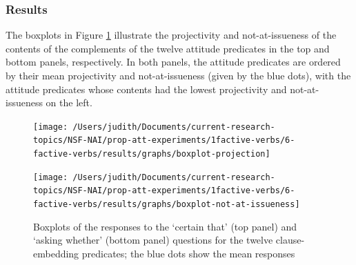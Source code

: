 \documentclass[11pt,fleqn]{article}
\newcommand{\6}{\mbox{$[\hspace*{-.6mm}[$}}
\newcommand{\9}{\mbox{$]\hspace*{-.6mm}]$}}
\begin{document}
\subsubsection{Results}

The boxplots in Figure \ref{f-exp1b} illustrate the projectivity and not-at-issueness of the contents of the complements of the twelve attitude predicates in the top and bottom panels, respectively. In both panels, the attitude predicates are ordered by their mean projectivity and not-at-issueness (given by the blue dots), with the attitude predicates whose contents had the lowest projectivity and not-at-issueness on the left. 

\begin{figure}[!h]

\begin{center}
\texttt{[image: /Users/judith/Documents/current-research-topics/NSF-NAI/prop-att-experiments/1factive-verbs/6-factive-verbs/results/graphs/boxplot-projection]}

\texttt{[image: /Users/judith/Documents/current-research-topics/NSF-NAI/prop-att-experiments/1factive-verbs/6-factive-verbs/results/graphs/boxplot-not-at-issueness]}
\end{center}

\caption{Boxplots of the responses to the `certain that' (top panel) and `asking whether' (bottom panel) questions for the twelve clause-embedding predicates; the blue dots show the mean responses}\label{f-exp1b}
\end{figure}
\end{document}
